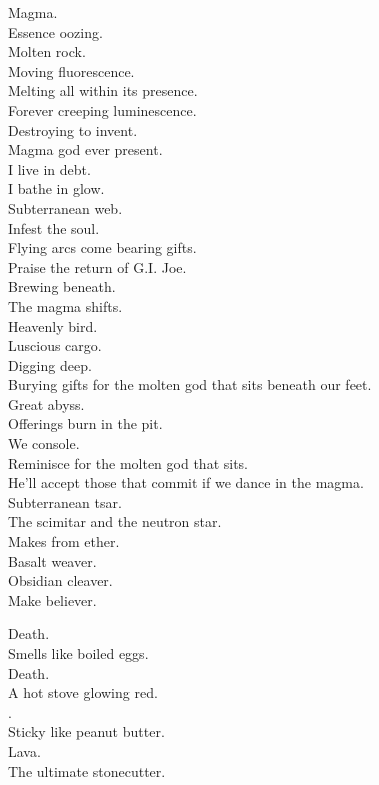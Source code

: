 Magma. \\
Essence oozing. \\
Molten rock. \\
Moving fluorescence. \\
Melting all within its presence. \\
Forever creeping luminescence. \\
Destroying to invent. \\
Magma god ever present. \\
I live in debt. \\
I bathe in glow. \\
Subterranean web. \\
Infest the soul. \\
Flying arcs come bearing gifts. \\
Praise the return of G.I. Joe. \\
Brewing beneath. \\
The magma shifts. \\
Heavenly bird. \\
Luscious cargo. \\
Digging deep. \\
Burying gifts for the molten god that sits beneath our feet. \\
Great abyss. \\
Offerings burn in the pit. \\
We console. \\
Reminisce for the molten god that sits. \\
He'll accept those that commit if we dance in the magma. \\
Subterranean tsar. \\
The scimitar and the neutron star. \\
Makes from ether. \\
Basalt weaver. \\
Obsidian cleaver. \\
Make believer. \\




Death. \\
Smells like boiled eggs. \\
Death. \\
A hot stove glowing red. \\
. \\
Sticky like peanut butter. \\
Lava. \\
The ultimate stonecutter. \\


